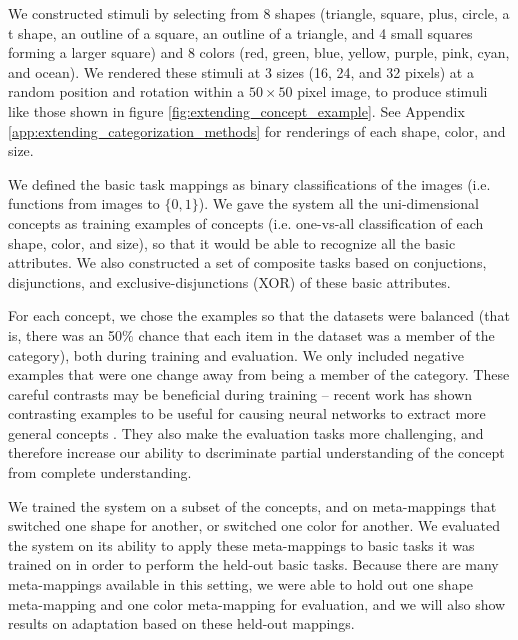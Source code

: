 We constructed stimuli by selecting from 8 shapes (triangle, square, plus, circle, a t shape, an outline of a square, an outline of a triangle, and 4 small squares forming a larger square) and 8 colors (red, green, blue, yellow, purple, pink, cyan, and ocean). We rendered these stimuli at 3 sizes (16, 24, and 32 pixels) at a random position and rotation within a \(50 \times 50\) pixel image, to produce stimuli like those shown in figure \ref{fig:extending_concept_example}. See Appendix \ref{app:extending_categorization_methods} for renderings of each shape, color, and size. \par
We defined the basic task mappings as binary classifications of the images (i.e. functions from images to \(\{0, 1\}\)). We gave the system all the uni-dimensional concepts as training examples of concepts (i.e. one-vs-all classification of each shape, color, and size), so that it would be able to recognize all the basic attributes. We also constructed a set of composite tasks based on conjuctions, disjunctions, and exclusive-disjunctions (XOR) of these basic attributes. \par
For each concept, we chose the examples so that the datasets were balanced (that is, there was an 50\% chance that each item in the dataset was a member of the category), both during training and evaluation. We only included negative examples that were one change away from being a member of the category. These careful contrasts may be beneficial during training -- recent work has shown contrasting examples to be useful for causing neural networks to extract more general concepts \citep{Hill2019}. They also make the evaluation tasks more challenging, and therefore increase our ability to dscriminate partial understanding of the concept from complete understanding. \par
We trained the system on a subset of the concepts, and on meta-mappings that switched one shape for another, or switched one color for another. We evaluated the system on its ability to apply these meta-mappings to basic tasks it was trained on in order to perform the held-out basic tasks. Because there are many meta-mappings available in this setting, we were able to hold out one shape meta-mapping and one color meta-mapping for evaluation, and we will also show results on adaptation based on these held-out mappings. \par  

